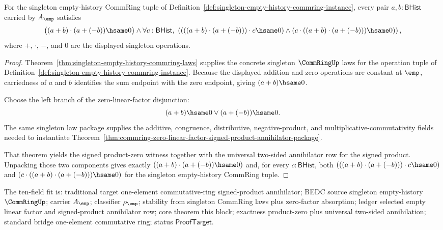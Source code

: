 \begin{theorem}
\label{thm:commring-singleton-empty-signed-product-annihilator-package}
For the singleton empty-history CommRing tuple of
Definition~\ref{def:singleton-empty-history-commring-instance}, every pair
$a,b:\mathsf{BHist}$ carried by $A_{\emp}$ satisfies
$$
\bigl((a+b)\cdot(a+(-b))\hsame0\bigr)\land
\forall c:\mathsf{BHist},\
\left(
(((a+b)\cdot(a+(-b)))\cdot c\hsame0)
\land
(c\cdot((a+b)\cdot(a+(-b)))\hsame0)
\right),
$$
where $+$, $\cdot$, $-$, and $0$ are the displayed singleton operations.
\end{theorem}
\begin{proof}
Theorem~\ref{thm:singleton-empty-history-commring-laws} supplies the concrete
singleton $\CommRingUp$ laws for the operation tuple of
Definition~\ref{def:singleton-empty-history-commring-instance}. Because the
displayed addition and zero operations are constant at $\emp$, carriedness of
$a$ and $b$ identifies the sum endpoint with the zero endpoint, giving
$(a+b)\hsame0$.

Choose the left branch of the zero-linear-factor disjunction:
$$
(a+b)\hsame0 \lor (a+(-b))\hsame0 .
$$
The same singleton law package supplies the additive, congruence,
distributive, negative-product, and multiplicative-commutativity fields needed
to instantiate
Theorem~\ref{thm:commring-zero-linear-factor-signed-product-annihilator-package}.

That theorem yields the signed product-zero witness together with the universal
two-sided annihilator row for the signed product. Unpacking those two components
gives exactly $((a+b)\cdot(a+(-b))\hsame0)$ and, for every
$c:\mathsf{BHist}$, both $(((a+b)\cdot(a+(-b)))\cdot c\hsame0)$ and
$(c\cdot((a+b)\cdot(a+(-b)))\hsame0)$ for the singleton empty-history CommRing
tuple.
\end{proof}

The ten-field fit is: traditional target one-element commutative-ring
signed-product annihilator; BEDC source singleton empty-history $\CommRingUp$;
carrier $A_{\emp}$; classifier $\rho_{\emp}$; stability from singleton CommRing
laws plus zero-factor absorption; ledger selected empty linear factor and
signed-product annihilator row; core theorem this block; exactness product-zero
plus universal two-sided annihilation; standard bridge one-element commutative
ring; status $\mathsf{ProofTarget}$.

